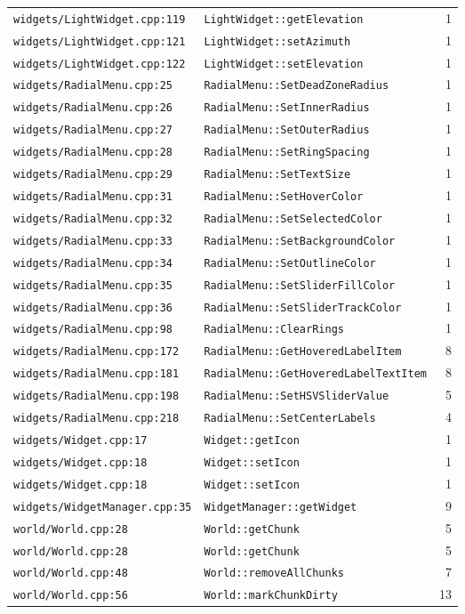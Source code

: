 \documentclass[11pt,a4paper]{article}
\begin{document}
{\begin{longtable}{L{0.40\textwidth} L{0.48\textwidth} r}
\texttt{widgets/LightWidget.cpp:119} & \texttt{LightWidget::getElevation} & 1 \\
\texttt{widgets/LightWidget.cpp:121} & \texttt{LightWidget::setAzimuth} & 1 \\
\texttt{widgets/LightWidget.cpp:122} & \texttt{LightWidget::setElevation} & 1 \\
\texttt{widgets/RadialMenu.cpp:25} & \texttt{RadialMenu::SetDeadZoneRadius} & 1 \\
\texttt{widgets/RadialMenu.cpp:26} & \texttt{RadialMenu::SetInnerRadius} & 1 \\
\texttt{widgets/RadialMenu.cpp:27} & \texttt{RadialMenu::SetOuterRadius} & 1 \\
\texttt{widgets/RadialMenu.cpp:28} & \texttt{RadialMenu::SetRingSpacing} & 1 \\
\texttt{widgets/RadialMenu.cpp:29} & \texttt{RadialMenu::SetTextSize} & 1 \\
\texttt{widgets/RadialMenu.cpp:31} & \texttt{RadialMenu::SetHoverColor} & 1 \\
\texttt{widgets/RadialMenu.cpp:32} & \texttt{RadialMenu::SetSelectedColor} & 1 \\
\texttt{widgets/RadialMenu.cpp:33} & \texttt{RadialMenu::SetBackgroundColor} & 1 \\
\texttt{widgets/RadialMenu.cpp:34} & \texttt{RadialMenu::SetOutlineColor} & 1 \\
\texttt{widgets/RadialMenu.cpp:35} & \texttt{RadialMenu::SetSliderFillColor} & 1 \\
\texttt{widgets/RadialMenu.cpp:36} & \texttt{RadialMenu::SetSliderTrackColor} & 1 \\
\texttt{widgets/RadialMenu.cpp:98} & \texttt{RadialMenu::ClearRings} & 1 \\
\texttt{widgets/RadialMenu.cpp:172} & \texttt{RadialMenu::GetHoveredLabelItem} & 8 \\
\texttt{widgets/RadialMenu.cpp:181} & \texttt{RadialMenu::GetHoveredLabelTextItem} & 8 \\
\texttt{widgets/RadialMenu.cpp:198} & \texttt{RadialMenu::SetHSVSliderValue} & 5 \\
\texttt{widgets/RadialMenu.cpp:218} & \texttt{RadialMenu::SetCenterLabels} & 4 \\
\texttt{widgets/Widget.cpp:17} & \texttt{Widget::getIcon} & 1 \\
\texttt{widgets/Widget.cpp:18} & \texttt{Widget::setIcon} & 1 \\
\texttt{widgets/Widget.cpp:18} & \texttt{Widget::setIcon} & 1 \\
\texttt{widgets/WidgetManager.cpp:35} & \texttt{WidgetManager::getWidget} & 9 \\
\texttt{world/World.cpp:28} & \texttt{World::getChunk} & 5 \\
\texttt{world/World.cpp:28} & \texttt{World::getChunk} & 5 \\
\texttt{world/World.cpp:48} & \texttt{World::removeAllChunks} & 7 \\
\texttt{world/World.cpp:56} & \texttt{World::markChunkDirty} & 13 \\
\bottomrule
\end{longtable}}
\end{document}
